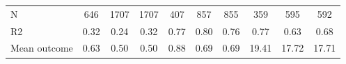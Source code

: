 \begin{tabular}{lccc|ccc|ccc}
N           &         646         &        1707         &        1707         &         407         &         857         &         855         &         359         &         595         &         592         \\
R2          &        0.32         &        0.24         &        0.32         &        0.77         &        0.80         &        0.76         &        0.77         &        0.63         &        0.68         \\
Mean outcome&        0.63         &        0.50         &        0.50         &        0.88         &        0.69         &        0.69         &       19.41         &       17.72         &       17.71         \\
\bottomrule \end{tabular}
